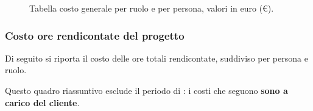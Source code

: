 \begin{figure}[H]

  
  \label{tab:rend}

  \caption{Tabella costo generale per ruolo e per persona, valori in euro (\euro).}
\end{figure} 


\subsubsection{Costo ore rendicontate del progetto}
Di seguito si riporta il costo delle ore totali rendicontate, suddiviso per persona e ruolo.

Questo quadro riassuntivo esclude il periodo di {\AR}: i costi che seguono \textbf{ sono a carico del cliente}.

